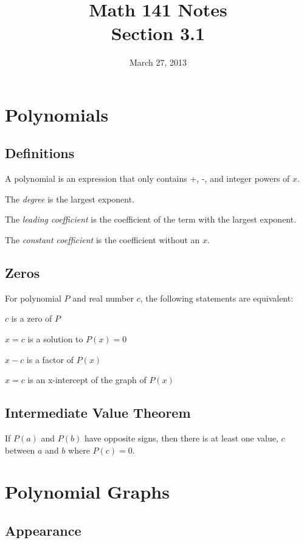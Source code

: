 \documentclass{article}
\title{Math 141 Notes \\ Section 3.1}
\date{March 27, 2013}
\begin{document}
\maketitle
\tableofcontents

\section{Polynomials}

\subsection{Definitions}

\begin{itemize*}
  \item A polynomial is an expression that only contains +, -, and integer powers of $x$.
  \item The {\em degree} is the largest exponent.
  \item The {\em leading coefficient} is the coefficient of the term with the largest exponent.
  \item The {\em constant coefficient} is the coefficient without an $x$.
\end{itemize*}

\subsection{Zeros}
For polynomial $P$ and real number $c$, the following statements are equivalent:
\begin{itemize*}
  \item $c$ is a zero of $P$
  \item $x = c$ is a solution to $P(x) = 0$
  \item $x - c$ is a factor of $P(x)$
  \item $x = c$ is an x-intercept of the graph of $P(x)$
\end{itemize*}

\subsection{Intermediate Value Theorem}
If $P(a)$ and $P(b)$ have opposite signs, then there is at least one value, $c$ between $a$ and $b$ where $P(c) = 0$.

\section{Polynomial Graphs}
\subsection{Appearance}
\end{document}
